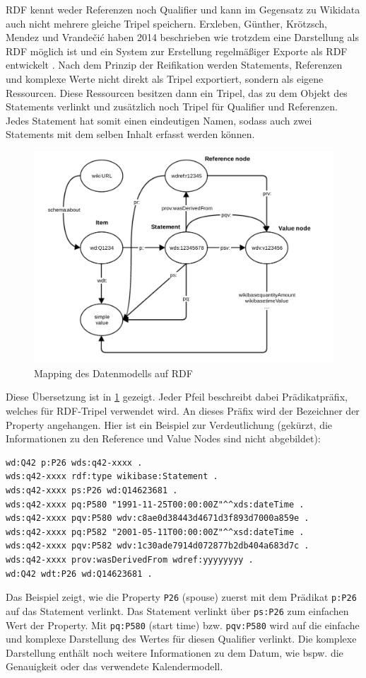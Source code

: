 RDF kennt weder Referenzen noch Qualifier und kann im Gegensatz zu Wikidata auch nicht mehrere gleiche Tripel speichern.
Erxleben, Günther, Krötzsch, Mendez und Vrandečić haben 2014 beschrieben wie trotzdem eine Darstellung als RDF möglich ist und ein System zur Erstellung regelmäßiger Exporte als RDF entwickelt \cite{wikidata-rdf-export}.
Nach dem Prinzip der Reifikation werden Statements, Referenzen und komplexe Werte nicht direkt als Tripel exportiert, sondern als eigene Ressourcen. 
Diese Ressourcen besitzen dann ein Tripel, das zu dem Objekt des Statements verlinkt und zusätzlich noch Tripel für Qualifier und Referenzen.
Jedes Statement hat somit einen eindeutigen Namen, sodass auch zwei Statements mit dem selben Inhalt erfasst werden können.
\begin{figure}
  \includegraphics[width=\linewidth]{pics/Rdf_mapping}
  \caption{Mapping des Datenmodells auf RDF}
  \label{fig:rdf-mapping}
\end{figure}

Diese Übersetzung ist in \cref{fig:rdf-mapping} gezeigt.
Jeder Pfeil beschreibt dabei Prädikatpräfix, welches für RDF-Tripel verwendet wird.
An dieses Präfix wird der Bezeichner der Property angehangen.
Hier ist ein Beispiel zur Verdeutlichung (gekürzt, die Informationen zu den Reference und Value Nodes sind nicht abgebildet):
\begin{lstlisting}[language=SPARQL]
wd:Q42 p:P26 wds:q42-xxxx .
wds:q42-xxxx rdf:type wikibase:Statement .
wds:q42-xxxx ps:P26 wd:Q14623681 .
wds:q42-xxxx pq:P580 "1991-11-25T00:00:00Z"^^xds:dateTime .
wds:q42-xxxx pqv:P580 wdv:c8ae0d38443d4671d3f893d7000a859e .
wds:q42-xxxx pq:P582 "2001-05-11T00:00:00Z"^^xsd:dateTime .
wds:q42-xxxx pqv:P582 wdv:1c30ade7914d072877b2db404a683d7c .
wds:q42-xxxx prov:wasDerivedFrom wdref:yyyyyyyy .
wd:Q42 wdt:P26 wd:Q14623681 .
\end{lstlisting}
Das Beispiel zeigt, wie die Property \verb|P26| (spouse) zuerst mit dem Prädikat \verb|p:P26| auf das Statement verlinkt.
Das Statement verlinkt über \verb|ps:P26| zum einfachen Wert der Property.
Mit \verb|pq:P580| (start time) bzw. \verb|pqv:P580| wird auf die einfache und komplexe Darstellung des Wertes für diesen Qualifier verlinkt.
Die komplexe Darstellung enthält noch weitere Informationen zu dem Datum, wie bspw. die Genauigkeit oder das verwendete Kalendermodell.

